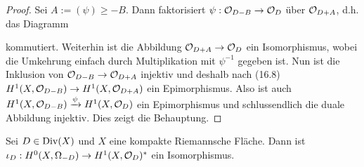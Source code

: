 \begin{proof}
  Sei $A := (\psi) \geq -B$. Dann faktorisiert $\psi: \mathcal{O}_{D-B} \rightarrow
  \mathcal{O}_D$ über $\mathcal{O}_{D+A}$, d.h. das Diagramm
  \begin{center}
  \end{center}
  kommutiert. Weiterhin ist die Abbildung $\mathcal{O}_{D+A} \rightarrow \mathcal{O}_D$ ein
  Isomorphismus, wobei die Umkehrung einfach durch Multiplikation mit
  $\psi^{-1}$ gegeben ist. Nun ist die Inklusion von $\mathcal{O}_{D-B} \rightarrow
  \mathcal{O}_{D+A}$ injektiv und deshalb nach (16.8) $H^1(X, \mathcal{O}_{D-B}) \rightarrow
  H^1(X, \mathcal{O}_{D+A})$ ein Epimorphismus. Also ist auch $H^1(X,
  \mathcal{O}_{D-B}) \xrightarrow{\psi} H^1(X, \mathcal{O}_D)$ ein Epimorphismus und
  schlussendlich die duale Abbildung injektiv. Dies zeigt die Behauptung.
\end{proof}

\begin{thm}
  Sei $D \in \operatorname{Div}(X)$ und $X$ eine kompakte Riemannsche Fläche. Dann
  ist $\iota_D: H^0(X, \Omega_{-D}) \rightarrow H^1(X, \mathcal{O}_D)^\ast$ ein Isomorphismus.
\end{thm}

